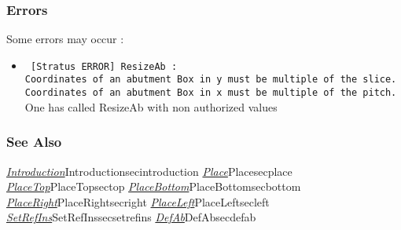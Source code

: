 \subsubsection{Errors}
    
Some errors may occur :
\begin{itemize}
    \item \verb- [Stratus ERROR] ResizeAb :-\\\verb-Coordinates of an abutment Box in y must be multiple of the slice.-\\\verb-Coordinates of an abutment Box in x must be multiple of the pitch.-\\One has called ResizeAb with non authorized values
\end{itemize}

\subsubsection{See Also}

\hyperref[ref]{\emph{Introduction}}{}{Introduction}{secintroduction}
\hyperref[ref]{\emph{Place}}{}{Place}{secplace}
\hyperref[ref]{\emph{PlaceTop}}{}{PlaceTop}{sectop}
\hyperref[ref]{\emph{PlaceBottom}}{}{PlaceBottom}{secbottom}
\hyperref[ref]{\emph{PlaceRight}}{}{PlaceRight}{secright}
\hyperref[ref]{\emph{PlaceLeft}}{}{PlaceLeft}{secleft}
\hyperref[ref]{\emph{SetRefIns}}{}{SetRefIns}{secsetrefins}
\hyperref[ref]{\emph{DefAb}}{}{DefAb}{secdefab}
